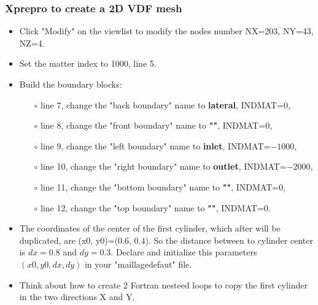 \documentclass[10pt, hyperref={unicode=true,pdfusetitle, bookmarks=true,bookmarksnumbered=false,bookmarksopen=false, breaklinks=false,pdfborder={0 0 1},backref=true,colorlinks=true,linkcolor=darkblue,pageanchor}]{beamer}
\begin{document}
\begin{frame}
\frametitle{Xprepro to create a 2D VDF mesh}
\begin{block}{}

\begin{itemize}
\item Click "Modify" on the viewlist to modify the nodes number NX=203, NY=43, NZ=4.
\item Set the matter index to 1000, line 5.
\item Build the boundary blocks:
    \begin{itemize}
    \item [$\circ$] line 7, change the "back boundary" name to \textbf{lateral}, INDMAT=$0$,
    \item [$\circ$] line 8, change the "front boundary" name to \textbf{""}, INDMAT=$0$,
    \item [$\circ$] line 9, change the "left boundary" name to \textbf{inlet}, INDMAT=$-1000$,
    \item [$\circ$] line 10, change the "right boundary" name to \textbf{outlet}, INDMAT=$-2000$,
    \item [$\circ$] line 11, change the "bottom boundary" name to \textbf{""}, INDMAT=$0$,
    \item [$\circ$] line 12, change the "top boundary" name to \textbf{""}, INDMAT=$0$.
    \end{itemize}

\item The coordinates of the center of the first cylinder, which after will be duplicated, are (x0, y0)=(0.6, 0.4). So the distance between to cylinder center is $dx=0.8$ and $dy=0.3$. Declare and initialize this parameters $(x0, y0, dx, dy)$ in your "maillagedefaut" file.

\item Think about how to create 2 Fortran nesteed loops to copy the first cylinder in the two directions X and Y.
\end{itemize}

\end{block}
\end{frame}
\end{document}
